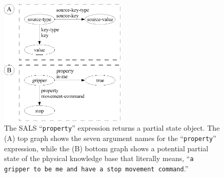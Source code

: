\begin{figure}
\centering
\includegraphics[width=6cm]{gfx/property_partial_state_graph-handdrawn}
\caption[The SALS ``{\tt{property}}'' expression returns a partial
  state object.]{The SALS ``{\tt{property}}'' expression returns a
  partial state object.  The (A) top graph shows the seven argument
  names for the ``{\tt{property}}'' expression, while the (B) bottom
  graph shows a potential partial state of the physical knowledge base
  that literally means, ``{\tt{a gripper to be me and have a stop
      movement command}}.''}
\label{figure:property_partial_state_graph}
\end{figure}


